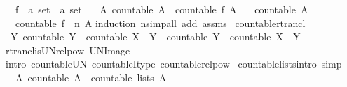 \begin{isabellebody}
\ \ \ f\ {\isacharcolon}{\isacharcolon}\ {\isachardoublequoteopen}{\isacharprime}a\ set\ {\isasymRightarrow}\ {\isacharprime}a\ set{\isachardoublequoteclose}\isanewline
\ \ \ {\isachardoublequoteopen}{\isasymAnd}A{\isachardot}\ countable\ A\ {\isasymLongrightarrow}\ countable\ {\isacharparenleft}f\ A{\isacharparenright}{\isachardoublequoteclose}\isanewline
\ \ \ {\isachardoublequoteopen}countable\ A{\isachardoublequoteclose}\isanewline
\ \ \ {\isachardoublequoteopen}countable\ {\isacharparenleft}{\isacharparenleft}f\ {\isacharcircum}{\isacharcircum}\ n{\isacharparenright}\ A{\isacharparenright}{\isachardoublequoteclose}\isanewline
%
\isadelimproof
%
\endisadelimproof
%
\isatagproof
{}\isamarkupfalse%
{\isacharparenleft}induction\ n{\isacharparenright}{\isacharparenleft}simp{\isacharunderscore}all\ add{\isacharcolon}\ assms{\isacharparenright}%
\endisatagproof
{\isafoldproof}%
%
\isadelimproof
\isanewline
%
\endisadelimproof
\isanewline
{}\isamarkupfalse%
\ countable{\isacharunderscore}rtrancl{\isacharcolon}\isanewline
\ \ {\isachardoublequoteopen}{\isacharparenleft}{\isasymAnd}Y{\isachardot}\ countable\ Y\ {\isasymLongrightarrow}\ countable\ {\isacharparenleft}X\ {\isacharbackquote}{\isacharbackquote}\ Y{\isacharparenright}{\isacharparenright}\ {\isasymLongrightarrow}\ countable\ Y\ {\isasymLongrightarrow}\ countable\ {\isacharparenleft}X\isactrlsup {\isacharasterisk}\ {\isacharbackquote}{\isacharbackquote}\ Y{\isacharparenright}{\isachardoublequoteclose}\isanewline
%
\isadelimproof
\ \ %
\endisadelimproof
%
\isatagproof
{}\isamarkupfalse%
\ rtrancl{\isacharunderscore}is{\isacharunderscore}UN{\isacharunderscore}relpow\ UN{\isacharunderscore}Image\ \isamarkupfalse%
\ {\isacharparenleft}intro\ countable{\isacharunderscore}UN\ countableI{\isacharunderscore}type\ countable{\isacharunderscore}relpow{\isacharparenright}%
\endisatagproof
{\isafoldproof}%
%
\isadelimproof
\isanewline
%
\endisadelimproof
\isanewline
{}\isamarkupfalse%
\ countable{\isacharunderscore}lists{\isacharbrackleft}intro{\isacharcomma}\ simp{\isacharbrackright}{\isacharcolon}\isanewline
\ \ \ A{\isacharcolon}\ {\isachardoublequoteopen}countable\ A{\isachardoublequoteclose}\ \ {\isachardoublequoteopen}countable\ {\isacharparenleft}lists\ A{\isacharparenright}{\isachardoublequoteclose}\isanewline
%
\isadelimproof
%
\endisadelimproof
%
\isatagproof
{}\isamarkupfalse%
\ {\isacharminus}\isanewline

\end{isabellebody}
